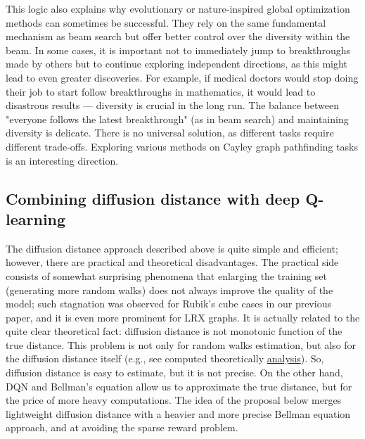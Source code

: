 \documentclass[reqno,11pt]{amsart}
\begin{document}
This logic also explains why evolutionary or nature-inspired global optimization methods can sometimes be successful. They rely on the same fundamental mechanism as beam search but offer better control over the diversity within the beam.
In some cases, it is important not to immediately jump to breakthroughs made by others but to continue exploring independent directions, as this might lead to even greater discoveries. For example, if medical doctors would stop doing their job to start follow breakthroughs in mathematics, it would lead to disastrous results — diversity is crucial in the long run.
The balance between "everyone follows the latest breakthrough" (as in beam search) and maintaining diversity is delicate. There is no universal solution, as different tasks require different trade-offs. Exploring various methods on Cayley graph pathfinding tasks is an interesting direction.

\subsection{Combining diffusion distance with deep Q-learning} \label{sec-RLDD}
The diffusion distance approach described above is quite simple and efficient; however, there are practical and theoretical disadvantages. The practical side consists of somewhat surprising phenomena that enlarging the training set (generating more random walks) does not always improve the quality of the model; such stagnation was observed for Rubik's cube cases in our previous paper, and it is even more prominent for LRX graphs. It is actually related to the quite clear theoretical fact: diffusion distance is not monotonic function of the true distance.
This problem is not only for random walks estimation, but also for the diffusion distance itself (e.g., see computed theoretically \href{https://www.kaggle.com/code/fedmug/lrx-diffusion-distance-analysis}{analysis}).
So, diffusion distance is easy to estimate, but it is not precise. On the other hand, DQN and Bellman's equation allow us to approximate the true distance, but for the price of more heavy computations. 
The idea of the proposal below merges lightweight diffusion distance with a heavier and more precise Bellman equation approach, and at avoiding the sparse reward problem.
\end{document}
